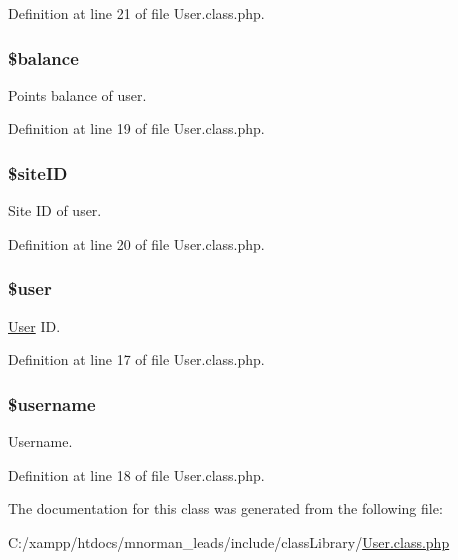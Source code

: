 Definition at line 21 of file User.\-class.\-php.

\hypertarget{class_user_ac600cdfc056c66926d1b3f5aff7088a9}{
\subsubsection[{\$balance}]{\setlength{\rightskip}{0pt plus 5cm}\$balance\hspace{0.3cm}{\ttfamily [private]}}}\label{class_user_ac600cdfc056c66926d1b3f5aff7088a9}
Points balance of user. 

Definition at line 19 of file User.\-class.\-php.

\hypertarget{class_user_a70db0a8c5bfb8523860867c5670cd399}{
\subsubsection[{\$site\-I\-D}]{\setlength{\rightskip}{0pt plus 5cm}\$site\-I\-D\hspace{0.3cm}{\ttfamily [private]}}}\label{class_user_a70db0a8c5bfb8523860867c5670cd399}
Site I\-D of user. 

Definition at line 20 of file User.\-class.\-php.

\hypertarget{class_user_a598ca4e71b15a1313ec95f0df1027ca5}{
\subsubsection[{\$user}]{\setlength{\rightskip}{0pt plus 5cm}\$user\hspace{0.3cm}{\ttfamily [private]}}}\label{class_user_a598ca4e71b15a1313ec95f0df1027ca5}
\hyperlink{class_user}{User} I\-D. 

Definition at line 17 of file User.\-class.\-php.

\hypertarget{class_user_a0eb82aa5f81cf845de4b36cd653c42cf}{
\subsubsection[{\$username}]{\setlength{\rightskip}{0pt plus 5cm}\$username\hspace{0.3cm}{\ttfamily [private]}}}\label{class_user_a0eb82aa5f81cf845de4b36cd653c42cf}
Username. 

Definition at line 18 of file User.\-class.\-php.



The documentation for this class was generated from the following file\-:\begin{DoxyCompactItemize}
\item 
C\-:/xampp/htdocs/mnorman\-\_\-leads/include/class\-Library/\hyperlink{_user_8class_8php}{User.\-class.\-php}\end{DoxyCompactItemize}
